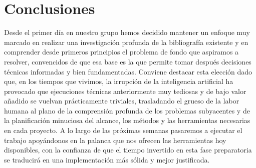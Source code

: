 \documentclass[11pt,a4paper]{article}
\begin{document}
\section{Conclusiones}

Desde el primer día en nuestro grupo hemos decidido mantener un enfoque muy marcado en realizar una investigación profunda de la bibliografía existente y en comprender desde primeros principios el problema de fondo que aspiramos a resolver, convencidos de que esa base es la que permite tomar después decisiones técnicas informadas y bien fundamentadas. Conviene destacar esta elección dado que, en los tiempos que vivimos, la irrupción de la inteligencia artificial ha provocado que ejecuciones técnicas anteriormente muy tediosas y de bajo valor añadido se vuelvan prácticamente triviales, trasladando el grueso de la labor humana al plano de la comprensión profunda de los problemas subyacentes y de la planificación minuciosa del alcance, los métodos y las herramientas necesarias en cada proyecto. A lo largo de las próximas semanas pasaremos a ejecutar el trabajo apoyándonos en la palanca que nos ofrecen las herramientas hoy disponibles, con la confianza de que el tiempo invertido en esta fase preparatoria se traducirá en una implementación más sólida y mejor justificada.
\end{document}

